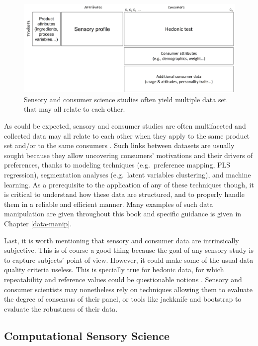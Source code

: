 \documentclass[
]{krantz}
\begin{document}
\begin{figure}
\includegraphics[width=0.9\linewidth]{images/multiple_data} \caption{Sensory and consumer science studies often yield multiple data set that may all relate to each other.}\label{fig:multipledata}
\end{figure}

As could be expected, sensory and consumer studies are often multifaceted and collected data may all relate to each other when they apply to the same product set and/or to the same consumers . Such links between datasets are usually sought because they allow uncovering consumers' motivations and their drivers of preferences, thanks to modeling techniques (e.g.~preference mapping, PLS regression), segmentation analyses (e.g.~latent variables clustering), and machine learning. As a prerequisite to the application of any of these techniques though, it is critical to understand how these data are structured, and to properly handle them in a reliable and efficient manner. Many examples of such data manipulation are given throughout this book and specific guidance is given in Chapter \ref{data-manip}.

Last, it is worth mentioning that sensory and consumer data are intrinsically subjective. This is of course a good thing because the goal of any sensory study is to capture subjects' point of view. However, it could make some of the usual data quality criteria useless. This is specially true for hedonic data, for which repeatability and reference values could be questionable notions \citep{Koster2003, Kosteretal2003}. Sensory and consumer scientists may nonetheless rely on techniques allowing them to evaluate the degree of consensus of their panel, or tools like jackknife and bootstrap to evaluate the robustness of their data.

\hypertarget{computational-sensory-science}{%
\subsection{Computational Sensory Science}\label{computational-sensory-science}}
\end{document}
